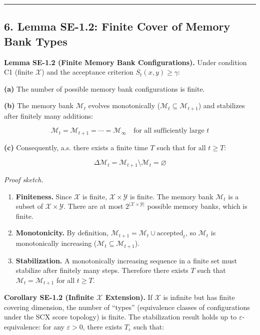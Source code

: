 \documentclass[
  12pt,
]{article}
\begin{document}
\begin{center}\rule{0.5\linewidth}{0.5pt}\end{center}

\subsection{6. Lemma SE-1.2: Finite Cover of Memory Bank
Types}\label{lemma-se-1.2-finite-cover-of-memory-bank-types}

\textbf{Lemma SE-1.2 (Finite Memory Bank Configurations).} Under
condition C1 (finite \(\mathcal{X}\)) and the acceptance criterion
\(S_t(x,y) \geq \gamma\):

\textbf{(a)} The number of possible memory bank configurations is
finite.

\textbf{(b)} The memory bank \(\mathcal{M}_t\) evolves monotonically
(\(\mathcal{M}_t \subseteq \mathcal{M}_{t+1}\)) and stabilizes after
finitely many additions:

\[
\mathcal{M}_t = \mathcal{M}_{t+1} = \cdots = \mathcal{M}_\infty \quad \text{for all sufficiently large } t
\]

\textbf{(c)} Consequently, a.s. there exists a finite time \(T\) such
that for all \(t \geq T\):

\[
\Delta \mathcal{M}_t = \mathcal{M}_{t+1} \setminus \mathcal{M}_t = \varnothing
\]

\emph{Proof sketch.}

\begin{enumerate}
\def\labelenumi{\arabic{enumi}.}
\item
  \textbf{Finiteness.} Since \(\mathcal{X}\) is finite,
  \(\mathcal{X} \times \mathcal{Y}\) is finite. The memory bank
  \(\mathcal{M}_t\) is a subset of \(\mathcal{X} \times \mathcal{Y}\).
  There are at most \(2^{|\mathcal{X} \times \mathcal{Y}|}\) possible
  memory banks, which is finite.
\item
  \textbf{Monotonicity.} By definition,
  \(\mathcal{M}_{t+1} = \mathcal{M}_t \cup \text{accepted}_t\), so
  \(\mathcal{M}_t\) is monotonically increasing
  (\(\mathcal{M}_t \subseteq \mathcal{M}_{t+1}\)).
\item
  \textbf{Stabilization.} A monotonically increasing sequence in a
  finite set must stabilize after finitely many steps. Therefore there
  exists \(T\) such that \(\mathcal{M}_t = \mathcal{M}_{t+1}\) for all
  \(t \geq T\).
\end{enumerate}

\textbf{Corollary SE-1.2 (Infinite \(\mathcal{X}\) Extension).} If
\(\mathcal{X}\) is infinite but has finite covering dimension, the
number of ``types'' (equivalence classes of configurations under the SCX
score topology) is finite. The stabilization result holds up to
\(\varepsilon\)-equivalence: for any \(\varepsilon > 0\), there exists
\(T_\varepsilon\) such that:
\end{document}
